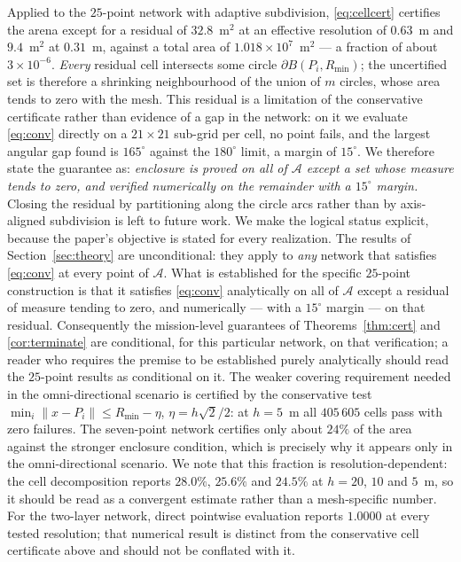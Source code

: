\documentclass[journal,10pt]{IEEEtran}
\theoremstyle{definition}
\newcommand{\Rmin}{R_{\min}}
\newcommand{\bA}{\mathcal{A}}
\begin{document}
Applied to the $25$-point network with adaptive subdivision, \eqref{eq:cellcert} certifies the
arena except for a residual of $32.8$~m$^2$ at an effective resolution of $0.63$~m and
$9.4$~m$^2$ at $0.31$~m, against a total area of $1.018\times10^{7}$~m$^2$ --- a fraction of about
$3\times10^{-6}$. \emph{Every} residual cell intersects some circle $\partial B(P_i,\Rmin)$; the
uncertified set is therefore a shrinking neighbourhood of the union of $m$ circles, whose area
tends to zero with the mesh. This residual is a limitation of the conservative certificate rather
than evidence of a gap in the network: on it we evaluate \eqref{eq:conv} directly on a
$21\times21$ sub-grid per cell, no point fails, and the largest angular gap found is
$165^\circ$ against the $180^\circ$ limit, a margin of $15^\circ$. We therefore state the
guarantee as: \emph{enclosure is proved on all of $\bA$ except a set whose measure tends to zero,
and verified numerically on the remainder with a $15^\circ$ margin.} Closing the residual by
partitioning along the circle arcs rather than by axis-aligned subdivision is left to future
work. We make the logical status explicit, because the paper's
objective is stated for every realization. The results of Section~\ref{sec:theory} are
unconditional: they apply to \emph{any} network that satisfies \eqref{eq:conv} at every point of
$\bA$. What is established for the specific $25$-point construction is that it satisfies
\eqref{eq:conv} analytically on all of $\bA$ except a residual of measure tending to zero, and
numerically --- with a $15^\circ$ margin --- on that residual. Consequently the mission-level
guarantees of Theorems~\ref{thm:cert} and \ref{cor:terminate} are conditional, for this particular
network, on that verification; a reader who requires the premise to be established purely
analytically should read the $25$-point results as conditional on it. The weaker
covering requirement needed in the omni-directional scenario is certified by the conservative test
$\min_i\|x-P_i\|\le\Rmin-\eta$, $\eta=h\sqrt2/2$: at $h=5$~m all $405\,605$ cells pass with zero
failures. The seven-point network certifies only about $24\%$ of the area against the stronger enclosure condition, which is precisely why it appears only in the omni-directional scenario. We note that this fraction is resolution-dependent: the cell decomposition reports $28.0\%$, $25.6\%$ and $24.5\%$ at $h=20$, $10$ and $5$~m, so it should be read as a convergent estimate rather than a mesh-specific number. For the two-layer network, direct pointwise evaluation reports $1.0000$ at every tested resolution; that numerical result is distinct from the conservative cell certificate above and should not be conflated with it.
\end{document}
